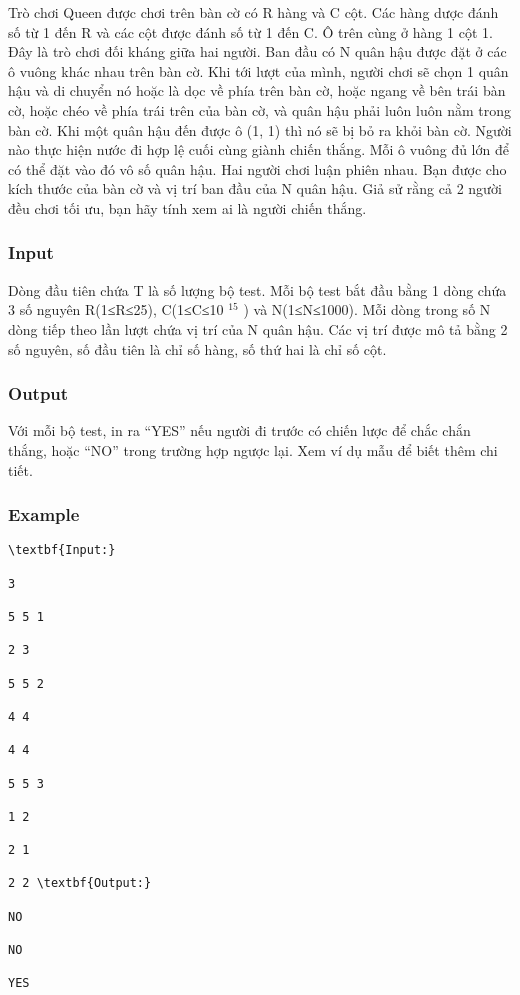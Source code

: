 







    Trò chơi Queen được chơi trên bàn cờ có R hàng và C cột. Các hàng dược đánh số từ 1 đến R và các cột được đánh số từ 1 đến C. Ô trên cùng ở hàng 1 cột 1. Đây là trò chơi đối kháng giữa hai người. Ban đầu có N quân hậu được đặt ở các ô vuông khác nhau trên bàn cờ. Khi tới lượt của mình, người chơi sẽ chọn 1 quân hậu và di chuyển nó hoặc là dọc về phía trên bàn cờ, hoặc ngang về bên trái bàn cờ, hoặc chéo về phía trái trên của bàn cờ, và quân hậu phải luôn luôn nằm trong bàn cờ. Khi một quân hậu đến được ô (1, 1) thì nó sẽ bị bỏ ra khỏi bàn cờ. Người nào thực hiện nước đi hợp lệ cuối cùng giành chiến thắng. Mỗi ô vuông đủ lớn để có thể đặt vào đó vô số quân hậu. Hai người chơi luận phiên nhau. Bạn được cho kích thước của bàn cờ và vị trí ban đầu của N quân hậu. Giả sử rằng cả 2 người đều chơi tối ưu, bạn hãy tính xem ai là người chiến thắng.   

\subsubsection{   Input  }

    Dòng đầu tiên chứa T là số lượng bộ test. Mỗi bộ test bắt đầu bằng 1 dòng chứa 3 số nguyên R(1≤R≤25), C(1≤C≤10    $^     15    $    ) và N(1≤N≤1000). Mỗi dòng trong số N dòng tiếp theo lần lượt chứa vị trí của N quân hậu. Các vị trí được mô tả bằng 2 số nguyên, số đầu tiên là chỉ số hàng, số thứ hai là chỉ số cột.   

\subsubsection{   Output  }

    Với mỗi bộ test, in ra “YES” nếu người đi trước có chiến lược để chắc chắn thắng, hoặc “NO” trong trường hợp ngược lại. Xem ví dụ mẫu để biết thêm chi tiết.   

\subsubsection{   Example  }
\begin{verbatim}
\textbf{Input:}

3 

5 5 1 

2 3 

5 5 2 

4 4 

4 4 

5 5 3 

1 2 

2 1 

2 2 \textbf{Output:}

NO 

NO 

YES \end{verbatim}


